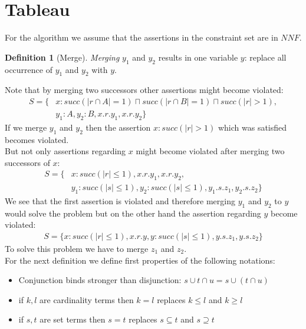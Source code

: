 \documentclass[a4paper,11pt]{scrartcl}
\theoremstyle{break}
\theoremstyle{definition}
\newtheorem{mydef}{Definition}
\begin{document}
\section{Tableau}
For the algorithm we assume that the assertions in the constraint set are in $NNF$.
\begin{mydef}[Merge]
\textit{Merging} $y_1$ and $y_2$ results in one variable $y$: replace all occurrence of $y_1$ and $y_2$ with $y$. 
\end{mydef}
Note that by merging two successors other assertions might become violated:
\begin{align}
S=\{&x:succ(|r\cap A|=1)\sqcap succ(|r\cap B|=1)\sqcap succ(|r|>1),\nonumber\\ &y_1:A, y_2:B, x.r.y_1, x.r.y_2\}
\end{align}
If we merge $y_1$ and $y_2$ then the assertion $x:succ(|r|>1)$ which was satisfied becomes violated.\\
But not only assertions regarding $x$ might become violated after merging two successors of $x$: 
\begin{align}
S=\{&x:succ(|r|\leq 1), x.r.y_1, x.r.y_2,\nonumber
\\&y_1:succ(|s|\leq 1), y_2:succ(|s|\leq 1), y_1.s.z_1, y_2.s.z_2\}
\end{align}
We see that the first assertion is violated and therefore merging $y_1$ and $y_2$ to $y$ would solve the problem but on the other hand the assertion regarding $y$ become violated: 
\begin{align*}
S=\{x:succ(|r|\leq 1), x.r.y,
y:succ(|s|\leq 1), y.s.z_1, y.s.z_2\}
\end{align*}
To solve this problem we have to merge $z_1$ and $z_2$.\\
For the next definition we define first properties of the following notations:
\begin{itemize}
\item Conjunction binds stronger than disjunction: $s\cup t\cap u = s\cup (t\cap u)$
\item if $k,l$ are cardinality terms then $k=l$ replaces $k\leq l$ and $k\geq l$ 
\item if $s,t$ are set terms then $s=t$ replaces $s\subseteq t$ and $s\supseteq t$
\end{itemize}
\end{document}
